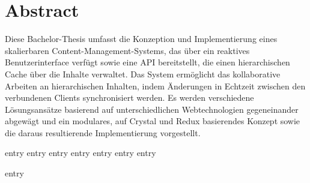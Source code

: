 \frontmatter
\maketitle

\chapter{Abstract}
\label{abstract}

Diese Bachelor-Thesis umfasst die Konzeption und Implementierung eines
skalierbaren Content-Management-Systems, das über ein reaktives
Benutzerinterface verfügt sowie eine API bereitstellt, die einen hierarchischen
Cache über die Inhalte verwaltet.  Das System ermöglicht das kollaborative
Arbeiten an hierarchischen Inhalten, indem Änderungen in Echtzeit zwischen den
verbundenen Clients synchronisiert werden.  Es werden verschiedene
Lösungsansätze basierend auf unterschiedlichen Webtechnologien gegeneinander
abgewägt und ein modulares, auf Crystal und Redux basierendes Konzept
sowie die daraus resultierende Implementierung vorgestellt.

\tableofcontents

\mainmatter
{entry}
{entry}
{entry}
{entry}
{entry}
{entry}
{entry}

\backmatter
\printbibliography%
{entry}
